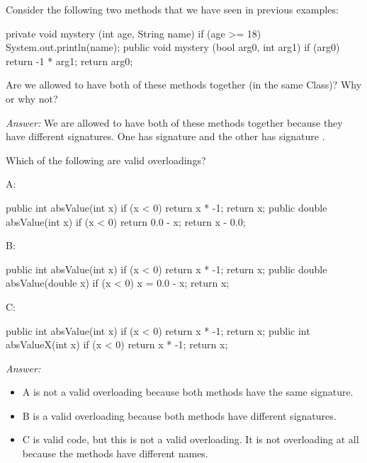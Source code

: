 \begin{example}
Consider the following two methods that we have seen in previous
examples:
\begin{code}
private void mystery (int age, String name) {
  if (age >= 18) {
    System.out.println(name);
  }
}
public void mystery (bool arg0, int arg1) {
  if (arg0) {
    return -1 * arg1;
  }
  return arg0;
}
\end{code}
Are we allowed to have both of these methods together (in the same Class)?
Why or why not?

\noindent \emph{Answer:}
We are allowed to have both of these methods together because they have
different signatures. One has signature 
and the other has signature .
\end{example}

\begin{example}
Which of the following are valid overloadings?

\noindent A:
\begin{code}
public int absValue(int x) {
  if (x < 0) {
    return x * -1;
  }
  return x;
}
public double absValue(int x) {
  if (x < 0) {
    return 0.0 - x;
  }
  return x - 0.0;
}
\end{code}

\noindent B:
\begin{code}
public int absValue(int x) {
  if (x < 0) {
    return x * -1;
  }
  return x;
}
public double absValue(double x) {
  if (x < 0) {
    x = 0.0 - x;
  }
  return x;
}
\end{code}

\noindent C:
\begin{code}
public int absValue(int x) {
  if (x < 0) {
    return x * -1;
  }
  return x;
}
public int absValueX(int x) {
  if (x < 0) {
    return x * -1;
  }
  return x;
}
\end{code}

\noindent \emph{Answer:}
\begin{itemize}
\item A is not a valid overloading because both methods have the same signature.
\item B is a valid overloading because both methods have different signatures.
\item C is valid code, but this is not a valid overloading. It is not overloading at all because the methods have different names.
\end{itemize}
\end{example}

